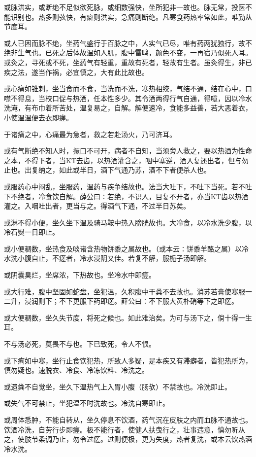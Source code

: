 \documentclass[a4paper,12pt,UTF8,twoside]{ctexbook}
\begin{document}
或脉洪实，或断绝不足似欲死脉，或细数强快，坐所犯非一故也。脉无常，投医不能识别也。热多则弦快，有癖则洪实，急痛则断绝。凡寒食药热率常如此，唯勤从节度耳。

或人已困而脉不绝，坐药气盛行于百脉之中，人实气已尽，唯有药两犹独行，故不绝非生气也。已死之后体故温如人肌，腹中雷鸣，颜色不变，一再宿乃似死人耳。或灸之，寻死或不死，坐药气有轻重，重故有死者，轻故有生者。虽灸得生，非已疾之法，遂当作祸，必宜慎之，大有此比故也。

或心痛如锥刺，坐当食而不食，当洗而不洗，寒热相绞，气结不通，结在心中，口噤不得息，当校口促与热酒，任本性多少。其令酒两得行气自通，得噫，因以冷水洗淹，有布巾着所苦处，温复易之，自解。解便速冷，食能多益善，若大恶着衣，小使温温便去衣即瘥。

于诸痛之中，心痛最为急者，救之若赴汤火，乃可济耳。

或有气断绝不知人时，撅口不可开，病者不自知，当须旁人救之，要以热酒为性命之本，不得下者，当KT去齿，以热酒灌含之，咽中塞逆，酒入复还出者，但与勿止也。出复纳之，如此或半日，酒下气通乃苏，酒不下者便杀人也。

或服药心中闷乱，坐服药，温药与疾争结故也。法当大吐下，不吐下当死。若不吐下不绝者，冷食饮自解。薛公曰∶若绝，不识人，目复不开者，亦当KT齿以热酒灌之。入咽吐出者，更当与之。得酒气下通，不过半日苏矣。

或淋不得小便，坐久坐下温及骑马鞍中热入膀胱故也。大冷食，以冷水洗少腹，以冷石熨一日即止。

或小便稠数，坐热食及啖诸含热物饼黍之属故也。（或本云∶饼黍羊酪之属）以冷水洗小腹自止，不瘥者，冷水浸阴又佳。若复不解，服栀子汤即解。

或阴囊臭烂，坐席浓，下热故也。坐冷水中即瘥。

或大行难，腹中坚固如蛇盘，坐犯温，久积腹中干粪不去故也。消苏若膏使寒服一二升，浸润则下；不下更服下药即瘥。薛公曰∶不下服大黄朴硝等下之即瘥。

或大便稠数，坐久失节度，将死之候也。如此难治矣。为可与汤下之，倘十得一生耳。

不与汤必死，莫畏不与也。下已致死，令人不恨。

或下痢如中寒，坐行止食饮犯热，所致人多疑，是本疾又有滞癖者，皆犯热所为，慎勿疑也。速脱衣、冷食、冷冻饮料、冷洗之。

或遗粪不自觉坐，坐久下温热气上入胃小腹（肠欤）不禁故也。冷洗即止。

或失气不可禁止，坐犯温不时洗故也。冷洗自寒即止。

或周体悉肿，不能自转从，坐久停息不饮酒，药气沉在皮肤之内而血脉不通故也。饮酒冷洗，自劳行步即瘥。极不能行者，使健人扶曳行之，壮事违意，慎勿听从之，使肢节柔调乃止，勿令过瘥。过则便极，更为失度，热者复洗，或本云饮热酒冷水洗。
\end{document}
